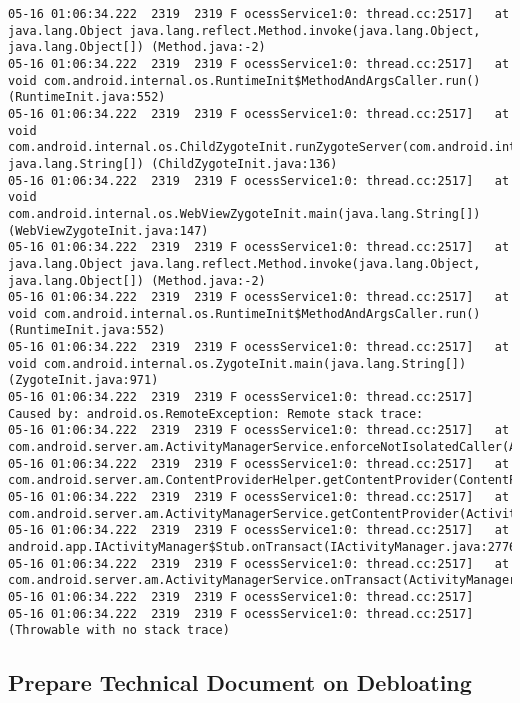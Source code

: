 \begin{lstlisting}
05-16 01:06:34.222  2319  2319 F ocessService1:0: thread.cc:2517]   at java.lang.Object java.lang.reflect.Method.invoke(java.lang.Object, java.lang.Object[]) (Method.java:-2)
05-16 01:06:34.222  2319  2319 F ocessService1:0: thread.cc:2517]   at void com.android.internal.os.RuntimeInit$MethodAndArgsCaller.run() (RuntimeInit.java:552)
05-16 01:06:34.222  2319  2319 F ocessService1:0: thread.cc:2517]   at void com.android.internal.os.ChildZygoteInit.runZygoteServer(com.android.internal.os.ZygoteServer, java.lang.String[]) (ChildZygoteInit.java:136)
05-16 01:06:34.222  2319  2319 F ocessService1:0: thread.cc:2517]   at void com.android.internal.os.WebViewZygoteInit.main(java.lang.String[]) (WebViewZygoteInit.java:147)
05-16 01:06:34.222  2319  2319 F ocessService1:0: thread.cc:2517]   at java.lang.Object java.lang.reflect.Method.invoke(java.lang.Object, java.lang.Object[]) (Method.java:-2)
05-16 01:06:34.222  2319  2319 F ocessService1:0: thread.cc:2517]   at void com.android.internal.os.RuntimeInit$MethodAndArgsCaller.run() (RuntimeInit.java:552)
05-16 01:06:34.222  2319  2319 F ocessService1:0: thread.cc:2517]   at void com.android.internal.os.ZygoteInit.main(java.lang.String[]) (ZygoteInit.java:971)
05-16 01:06:34.222  2319  2319 F ocessService1:0: thread.cc:2517] Caused by: android.os.RemoteException: Remote stack trace:
05-16 01:06:34.222  2319  2319 F ocessService1:0: thread.cc:2517] 	at com.android.server.am.ActivityManagerService.enforceNotIsolatedCaller(ActivityManagerService.java:3079)
05-16 01:06:34.222  2319  2319 F ocessService1:0: thread.cc:2517] 	at com.android.server.am.ContentProviderHelper.getContentProvider(ContentProviderHelper.java:130)
05-16 01:06:34.222  2319  2319 F ocessService1:0: thread.cc:2517] 	at com.android.server.am.ActivityManagerService.getContentProvider(ActivityManagerService.java:6782)
05-16 01:06:34.222  2319  2319 F ocessService1:0: thread.cc:2517] 	at android.app.IActivityManager$Stub.onTransact(IActivityManager.java:2776)
05-16 01:06:34.222  2319  2319 F ocessService1:0: thread.cc:2517] 	at com.android.server.am.ActivityManagerService.onTransact(ActivityManagerService.java:2763)
05-16 01:06:34.222  2319  2319 F ocessService1:0: thread.cc:2517] 
05-16 01:06:34.222  2319  2319 F ocessService1:0: thread.cc:2517] (Throwable with no stack trace)
\end{lstlisting}

\subsection{Prepare Technical Document on Debloating}


